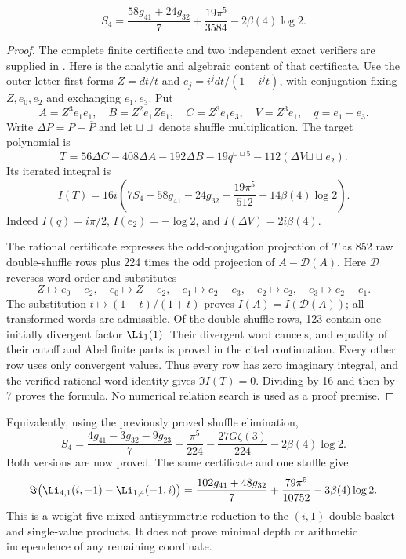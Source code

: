 \begin{theorem}
\label{gaussian:conj:S4}
\begin{equation}
 S_4=\frac{58g_{41}+24g_{32}}7
          +\frac{19\pi^5}{3584}-2\beta(4)\log2.
 \label{gaussian:eq:S4-short}
\end{equation}
\end{theorem}
\begin{proof}
The complete finite certificate and two independent exact verifiers are
supplied in \cite{CayleyS4Continuation2026}. Here is the analytic and
algebraic content of that certificate. Use the outer-letter-first forms
$Z=dt/t$ and $e_j=i^jdt/(1-i^jt)$, with conjugation fixing $Z,e_0,e_2$
and exchanging $e_1,e_3$. Put
\[
 A=Z^3e_1e_1,\quad B=Z^2e_1Ze_1,\quad C=Z^3e_1e_3,
 \quad V=Z^3e_1,\quad q=e_1-e_3.
\]
Write $\Delta P=P-\overline P$ and let $\mathbin{\sqcup\!\sqcup}$
denote shuffle multiplication. The target polynomial is
\[
 T=56\Delta C-408\Delta A-192\Delta B
       -19q^{\mathbin{\sqcup\!\sqcup}5}
       -112(\Delta V\mathbin{\sqcup\!\sqcup}e_2).
\]
Its iterated integral is
\[
 I(T)=16i\left(7S_4-58g_{41}-24g_{32}
                 -\frac{19\pi^5}{512}+14\beta(4)\log2\right).
\]
Indeed $I(q)=i\pi/2$, $I(e_2)=-\log2$, and
$I(\Delta V)=2i\beta(4)$.

The rational certificate expresses the odd-conjugation projection of
$T$ as 852 raw double-shuffle rows plus 224 times the odd projection of
$A-\mathcal D(A)$. Here $\mathcal D$ reverses word order and substitutes
\[
 Z\mapsto e_0-e_2,\quad e_0\mapsto Z+e_2,\quad
 e_1\mapsto e_2-e_3,\quad e_2\mapsto e_2,\quad
 e_3\mapsto e_2-e_1.
\]
The substitution $t\mapsto(1-t)/(1+t)$ proves $I(A)=I(\mathcal D(A))$;
all transformed words are admissible. Of the double-shuffle rows, 123
contain one initially divergent factor $\Li_1(1)$. Their divergent word
cancels, and equality of their cutoff and Abel finite parts is proved
in the cited continuation. Every other row uses only convergent values.
Thus every row has zero imaginary integral, and the verified rational
word identity gives $\Im I(T)=0$. Dividing by 16 and then by 7 proves
the formula. No numerical relation search is used as a proof premise.
\end{proof}

Equivalently, using the previously proved shuffle elimination,
\begin{equation}
 S_4=\frac{4g_{41}-3g_{32}-9g_{23}}7+\frac{\pi^5}{224}
        -\frac{27G\zeta(3)}{224}-2\beta(4)\log2.
 \label{gauss:eq:S4-closed}
\end{equation}
Both versions are now proved. The same certificate and one stuffle give
\begin{align}
 \Im\bigl(\Li_{4,1}(i,-1)-\Li_{1,4}(-1,i)\bigr)
 =\frac{102g_{41}+48g_{32}}7+\frac{79\pi^5}{10752}
     -3\beta(4)\log2.
 \label{cayley:eq:mixed-antisymmetric}
\end{align}
This is a weight-five mixed antisymmetric reduction to the $(i,1)$
double basket and single-value products. It does not prove minimal
depth or arithmetic independence of any remaining coordinate.
